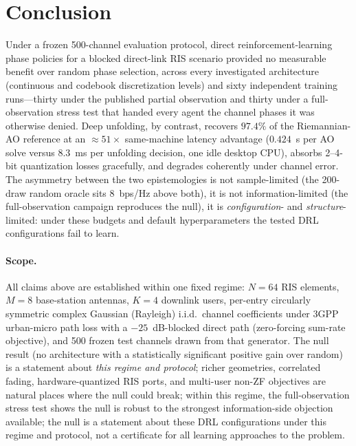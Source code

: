 \section{Conclusion}
\label{sec:conclusion}

Under a frozen 500-channel evaluation protocol, direct
reinforcement-learning phase policies for a blocked direct-link RIS
scenario provided no measurable benefit over random phase selection,
across every investigated architecture (continuous and codebook
discretization levels) and sixty independent training runs---thirty
under the published partial observation and thirty under a full-observation
stress test that handed every agent the channel phases it was otherwise
denied. Deep unfolding, by contrast, recovers $97.4\%$ of the
Riemannian-AO reference at an $\approx 51\times$ same-machine latency
advantage ($0.424$~s per AO solve versus $8.3$~ms per unfolding decision,
one idle desktop CPU), absorbs 2--4-bit
quantization losses gracefully, and degrades coherently under channel
error. The asymmetry between the two epistemologies is not
sample-limited (the 200-draw random oracle sits $8$~bps/Hz above both),
it is not information-limited (the full-observation campaign reproduces
the null), it is \emph{configuration}- and \emph{structure}-limited:
under these budgets and default hyperparameters the tested DRL
configurations fail to learn.

\paragraph{Scope.} All claims above are established within one fixed
regime: $N{=}64$ RIS elements, $M{=}8$ base-station antennas, $K{=}4$
downlink users, per-entry circularly symmetric complex Gaussian
(Rayleigh) i.i.d.\ channel coefficients under 3GPP urban-micro path
loss with a $-25$~dB-blocked direct path (zero-forcing sum-rate
objective), and 500 frozen test channels drawn from that generator.
The null result (no architecture with a statistically significant
positive gain over random) is a statement
about \emph{this regime and protocol}; richer geometries, correlated
fading, hardware-quantized RIS ports, and multi-user non-ZF
objectives are natural places where the null could break; within this
regime, the full-observation stress test shows the null is robust to
the strongest information-side objection available; the null is a
statement about these DRL configurations under this regime and protocol,
not a certificate for all learning approaches to the problem.

